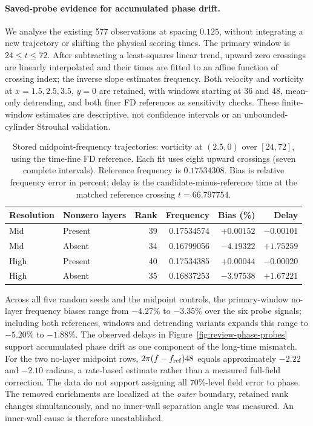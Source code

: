 \paragraph{Saved-probe evidence for accumulated phase drift.}
We analyse the existing 577 observations at spacing $0.125$, without integrating a new trajectory or shifting the physical scoring times. The primary window is $24\leq t\leq72$. After subtracting a least-squares linear trend, upward zero crossings are linearly interpolated and their times are fitted to an affine function of crossing index; the inverse slope estimates frequency. Both velocity and vorticity at $x=1.5,2.5,3.5$, $y=0$ are retained, with windows starting at 36 and 48, mean-only detrending, and both finer FD references as sensitivity checks. These finite-window estimates are descriptive, not confidence intervals or an unbounded-cylinder Strouhal validation.

\begin{table}[htbp]
\centering\small
\caption{Stored midpoint-frequency trajectories: vorticity at $(2.5,0)$ over $[24,72]$, using the time-fine FD reference. Each fit uses eight upward crossings (seven complete intervals). Reference frequency is $0.17534308$. Bias is relative frequency error in percent; delay is the candidate-minus-reference time at the matched reference crossing $t=66.797754$.}
\label{tab:review-phase-probes}
\begin{tabular}{llrrrr}
\toprule
Resolution & Nonzero layers & Rank & Frequency & Bias (\%) & Delay\\
\midrule
Mid & Present & 39 & 0.17534574 & $+0.00152$ & $-0.00101$\\
Mid & Absent & 34 & 0.16799056 & $-4.19322$ & $+1.75259$\\
High & Present & 40 & 0.17534385 & $+0.00044$ & $-0.00020$\\
High & Absent & 35 & 0.16837253 & $-3.97538$ & $+1.67221$\\
\bottomrule
\end{tabular}
\end{table}

Across all five random seeds and the midpoint controls, the primary-window no-layer frequency biases range from $-4.27\%$ to $-3.35\%$ over the six probe signals; including both references, windows and detrending variants expands this range to $-5.20\%$ to $-1.88\%$. The observed delays in Figure~\ref{fig:review-phase-probes} support accumulated phase drift as one component of the long-time mismatch. For the two no-layer midpoint rows, $2\pi(f-f_{\rm ref})48$ equals approximately $-2.22$ and $-2.10$ radians, a rate-based estimate rather than a measured full-field correction. The data do not support assigning all $70\%$-level field error to phase. The removed enrichments are localized at the \emph{outer} boundary, retained rank changes simultaneously, and no inner-wall separation angle was measured. An inner-wall cause is therefore unestablished.

